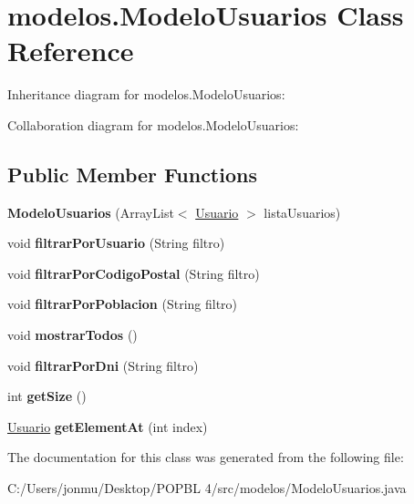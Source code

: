 \hypertarget{classmodelos_1_1_modelo_usuarios}{}\section{modelos.\+Modelo\+Usuarios Class Reference}
\label{classmodelos_1_1_modelo_usuarios}


Inheritance diagram for modelos.\+Modelo\+Usuarios\+:


Collaboration diagram for modelos.\+Modelo\+Usuarios\+:
\subsection*{Public Member Functions}
\begin{DoxyCompactItemize}
\item 
\mbox{\label{classmodelos_1_1_modelo_usuarios_a29eb753e9f246c911e679e28a7ba7173}} 
{\bfseries Modelo\+Usuarios} (Array\+List$<$ \mbox{\hyperlink{classobjetos_1_1_usuario}{Usuario}} $>$ lista\+Usuarios)
\item 
\mbox{\label{classmodelos_1_1_modelo_usuarios_a43fe9d71b2cb14a67af32df76c93f1ec}} 
void {\bfseries filtrar\+Por\+Usuario} (String filtro)
\item 
\mbox{\label{classmodelos_1_1_modelo_usuarios_a32302d42fef716e596f45c6ed27a3641}} 
void {\bfseries filtrar\+Por\+Codigo\+Postal} (String filtro)
\item 
\mbox{\label{classmodelos_1_1_modelo_usuarios_aa19c41161c68beb4f84f553bd3cca8b3}} 
void {\bfseries filtrar\+Por\+Poblacion} (String filtro)
\item 
\mbox{\label{classmodelos_1_1_modelo_usuarios_a319bbe3d654caccba263e75ae64e9f37}} 
void {\bfseries mostrar\+Todos} ()
\item 
\mbox{\label{classmodelos_1_1_modelo_usuarios_a65777b1abda04e3dd05762d1e5a4cc1d}} 
void {\bfseries filtrar\+Por\+Dni} (String filtro)
\item 
\mbox{\label{classmodelos_1_1_modelo_usuarios_a35b3ac033cacc65073296b297d92eb0b}} 
int {\bfseries get\+Size} ()
\item 
\mbox{\label{classmodelos_1_1_modelo_usuarios_ae477676a4f06527dc6f70b160ab5f426}} 
\mbox{\hyperlink{classobjetos_1_1_usuario}{Usuario}} {\bfseries get\+Element\+At} (int index)
\end{DoxyCompactItemize}


The documentation for this class was generated from the following file\+:\begin{DoxyCompactItemize}
\item 
C\+:/\+Users/jonmu/\+Desktop/\+P\+O\+P\+B\+L 4/src/modelos/Modelo\+Usuarios.\+java\end{DoxyCompactItemize}

